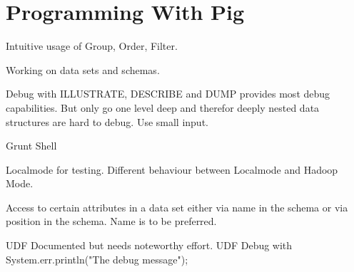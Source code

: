 \section{Programming With Pig}

Intuitive usage of Group, Order, Filter.

Working on data sets and schemas.

Debug with ILLUSTRATE, DESCRIBE and DUMP provides most debug capabilities. But only go one level deep and therefor deeply nested data structures are hard to debug. Use small input. 

Grunt Shell

Localmode for testing. Different behaviour between Localmode and Hadoop Mode.

Access to certain attributes in a data set either via name in the schema or via position in the schema. Name is to be preferred.

UDF Documented but needs noteworthy effort.
UDF Debug with System.err.println("The debug message");